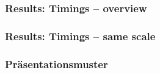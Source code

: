 \begin{frame}[c]
    \centering
    \frametitle{Results: Timings -- overview}
    \resizebox{!}{.35\textheight}{
        
    }
\end{frame}

\begin{frame}[c]
    \centering
    \frametitle{Results: Timings -- same scale}
    \resizebox{!}{.35\textheight}{
        
    }
\end{frame}



\PraesentationStartseiteFlaggen



\PraesentationTitelseite %


\begin{frame}
\end{frame}

\PraesentationMasterWeissSchwarz

\begin{frame}
    \frametitle{Präsentationsmuster}
\end{frame}



